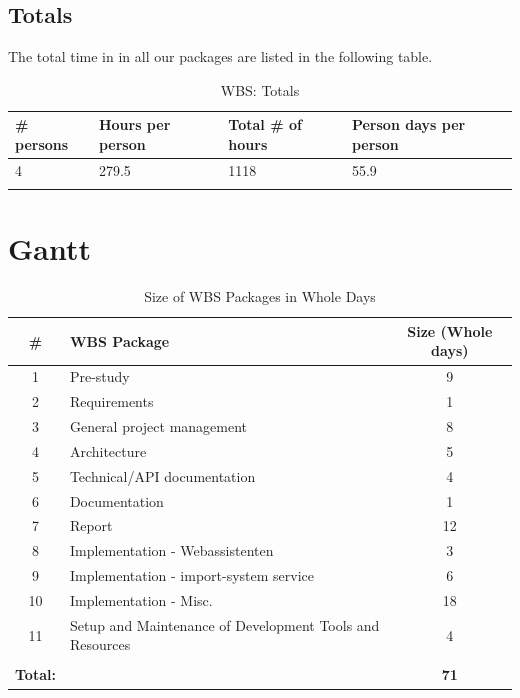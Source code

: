 \subsection{Totals}
The total time in in all our packages are listed in the following table.
\begin{longtable}{|p{2cm}|p{3cm}|p{3cm}|p{4.5cm}|}
\hline
\# persons & Hours per person & Total \# of hours & Person days per person\\ 
\hline
4 & 279.5 & 1118 & 55.9\\ 
\hline
\caption{WBS: Totals}
\end{longtable}

\section{Gantt}
\begin{table}[H]
\centering
\begin{tabular}{|c|p{8cm}|c|}
\hline
\textbf{\#} & \textbf{WBS Package} & \textbf{Size (Whole days)}\\ 
\hline
1 & Pre-study & 9\\ 
\hline
2 & Requirements & 1\\ 
\hline
3 & General project management & 8\\ 
\hline
4 & Architecture & 5\\ 
\hline
5 & Technical/API documentation & 4\\ 
\hline
6 & Documentation & 1\\ 
\hline
7 & Report & 12\\ 
\hline
8 & Implementation - Webassistenten & 3\\ 
\hline
9 & Implementation - import-system service & 6\\ 
\hline
10 & Implementation - Misc. & 18\\ 
\hline
11 & Setup and Maintenance of Development Tools and Resources & 4\\ 
\hline
 &  & \\ 
\hline
\textbf{Total:} &  & \textbf{71}\\ 
\hline\end{tabular}
\label{table:WBSdays}
\caption{\small{Size of WBS Packages in Whole Days}} 
\end{table}

